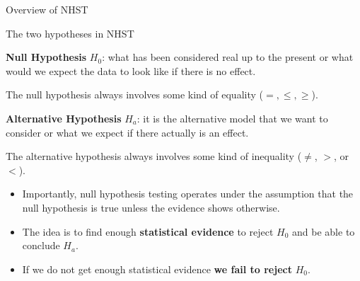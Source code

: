 \documentclass[handout]{beamer}
\begin{document}
\begin{frame}{Overview of NHST}
\scriptsize{
\begin{block}{The two hypotheses in NHST}
 \begin{itemize}
\scriptsize{
\item \textbf{Null Hypothesis} $H_{0}$: what has been considered real up to the present or what would we expect the data to look like if there is no effect.
\begin{itemize}
\scriptsize{
 \item The null hypothesis always involves some kind of equality ($=, \leq,\geq$).}
\end{itemize}



\item \textbf{Alternative Hypothesis} $H_{a}$: it is the alternative model that we want to consider or  what we expect if there actually is an effect. 
\begin{itemize}
\scriptsize{
 \item The alternative hypothesis always involves some kind of inequality ($\neq$, $>$, or $<$).}
\end{itemize}


}
 \end{itemize}
 
\end{block}


\begin{itemize}
\item Importantly, null hypothesis testing operates under the assumption that the null hypothesis is true unless the evidence shows otherwise.
\item The idea is to find enough \textbf{statistical evidence} to reject $H_{0}$ and be able to conclude $H_{a}$.
\item If we do not get enough statistical evidence \textbf{we fail to reject} $H_{0}$.
\end{itemize}



} 
\end{frame}
\end{document}
